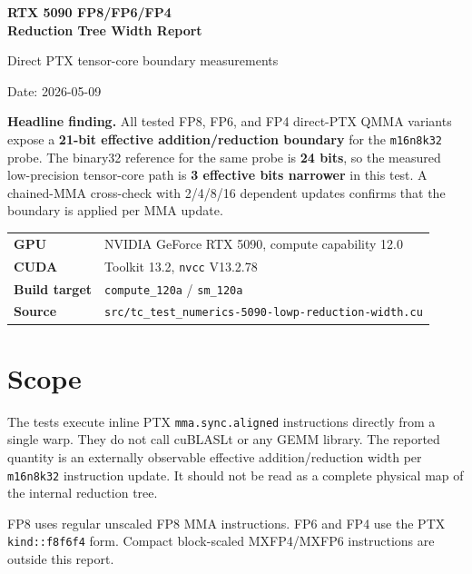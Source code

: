 \documentclass[11pt]{article}
\begin{document}

\begin{titlepage}
\vspace*{0.4in}
{\Huge\bfseries\color{accentdark} RTX 5090 FP8/FP6/FP4\\ Reduction Tree Width Report\par}
\vspace{0.2in}
{\Large Direct PTX tensor-core boundary measurements\par}
\vspace{0.25in}
{\color{muted}Date: 2026-05-09\par}
\vfill
\begin{summarybox}
\textbf{Headline finding.}
All tested FP8, FP6, and FP4 direct-PTX QMMA variants expose a
\textbf{21-bit effective addition/reduction boundary} for the
\texttt{m16n8k32} probe. The binary32 reference for the same probe is
\textbf{24 bits}, so the measured low-precision tensor-core path is
\textbf{3 effective bits narrower} in this test. A chained-MMA cross-check
with 2/4/8/16 dependent updates confirms that the boundary is applied per MMA
update.
\end{summarybox}
\vspace{0.2in}
\begin{tabularx}{\linewidth}{>{\bfseries}l Y}
\toprule
GPU & NVIDIA GeForce RTX 5090, compute capability 12.0 \\
CUDA & Toolkit 13.2, \texttt{nvcc} V13.2.78 \\
Build target & \texttt{compute\_120a} / \texttt{sm\_120a} \\
Source & \texttt{src/tc\_test\_numerics-5090-lowp-reduction-width.cu} \\
\bottomrule
\end{tabularx}
\end{titlepage}
\clearpage
{}

\section{Scope}

The tests execute inline PTX \texttt{mma.sync.aligned} instructions directly
from a single warp. They do not call cuBLASLt or any GEMM library. The reported
quantity is an externally observable effective addition/reduction width per
\texttt{m16n8k32} instruction update. It should not be read as a complete
physical map of the internal reduction tree.

FP8 uses regular unscaled FP8 MMA instructions. FP6 and FP4 use the PTX
\texttt{kind::f8f6f4} form. Compact block-scaled MXFP4/MXFP6 instructions are
outside this report.
\end{document}
